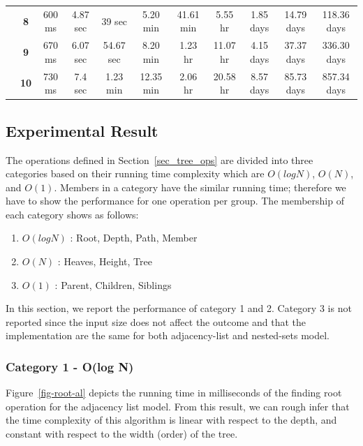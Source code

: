 \begin{table}[!h]
\begin{tabular}{cc|c|c|c|c|c|c|c|c|c|}
\multicolumn{1}{|c}{\textbf{}}                       & \multicolumn{1}{|c|}{\textbf{8}}  & 600 ms     & 4.87 sec   & 39 sec     & 5.20 min   & 41.61 min  & 5.55 hr    & 1.85 days  & 14.79 days & 118.36 days \\ \cline{2-11} 
\multicolumn{1}{|c}{\textbf{}}                       & \multicolumn{1}{|c|}{\textbf{9}}  & 670 ms     & 6.07 sec   & 54.67 sec  & 8.20 min   & 1.23 hr    & 11.07 hr   & 4.15 days  & 37.37 days & 336.30 days \\ \cline{2-11} 
\multicolumn{1}{|c}{\textbf{}}                       & \multicolumn{1}{|c|}{\textbf{10}} & 730 ms     & 7.4 sec    & 1.23 min   & 12.35 min  & 2.06 hr    & 20.58 hr   & 8.57 days  & 85.73 days & 857.34 days \\ \hline
\end{tabular}
\end{table}


\subsection{Experimental Result}\label{sec_rt_eval_result}

The operations defined in Section~\ref{sec_tree_ops} are divided into three categories based on their running time complexity which are $O(log N)$, $O(N)$, and $O(1)$. Members in a category have the similar running time; therefore we have to show the performance for one operation per group. The membership of each category shows as follows:

\begin{enumerate}
\item $O(log N)$ : Root, Depth, Path, Member
\item $O(N)$ : Heaves, Height, Tree
\item $O(1)$ : Parent, Children, Siblings
\end{enumerate}

In this section, we report the performance of category 1 and 2. Category 3 is not reported since the input size does not affect the outcome and that the implementation are the same for both adjacency-list and nested-sets model.

\subsubsection{Category 1 - O(log N)}\label{eval_group1}

Figure~\ref{fig-root-al} depicts the running time in milliseconds of the finding root operation for the adjacency list model. From this result, we can rough infer that the time complexity of this algorithm is linear with respect to the depth, and constant with respect to the width (order) of the tree.

